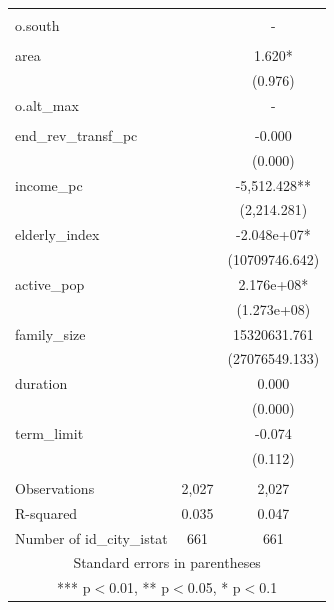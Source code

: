 \documentclass[]{article}
\begin{document}
\begin{tabular}{lcc}
 &  &  \\
o.south &  & - \\
 &  &  \\
area &  & 1.620* \\
 &  & (0.976) \\
o.alt\_max &  & - \\
 &  &  \\
end\_rev\_transf\_pc &  & -0.000 \\
 &  & (0.000) \\
income\_pc &  & -5,512.428** \\
 &  & (2,214.281) \\
elderly\_index &  & -2.048e+07* \\
 &  & (10709746.642) \\
active\_pop &  & 2.176e+08* \\
 &  & (1.273e+08) \\
family\_size &  & 15320631.761 \\
 &  & (27076549.133) \\
duration &  & 0.000 \\
 &  & (0.000) \\
term\_limit &  & -0.074 \\
 &  & (0.112) \\
 &  &  \\
Observations & 2,027 & 2,027 \\
R-squared & 0.035 & 0.047 \\
 Number of id\_city\_istat & 661 & 661 \\ \hline
\multicolumn{3}{c}{ Standard errors in parentheses} \\
\multicolumn{3}{c}{ *** p$<$0.01, ** p$<$0.05, * p$<$0.1} \\
\end{tabular}
\end{document}
